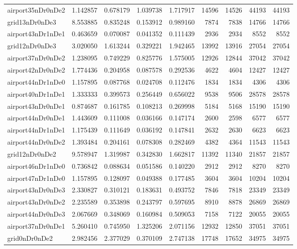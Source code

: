 \begin{longtable}{|l|r|r|r|r|r|r|r|r|}
airport35nDr0nDe2 & 1.142857 & 0.678179 & 1.039738 & 1.717917 & 14596 & 14526 & 44193 & 44193 \\
grid13nDr0nDe3 & 8.553885 & 0.835248 & 0.153912 & 0.989160 & 7874 & 7838 & 14766 & 14766 \\
airport43nDr1nDe1 & 0.463659 & 0.070087 & 0.041352 & 0.111439 & 2936 & 2934 & 8552 & 8552 \\
grid12nDr0nDe3 & 3.020050 & 1.613244 & 0.329221 & 1.942465 & 13992 & 13916 & 27054 & 27054 \\
airport37nDr0nDe2 & 1.238095 & 0.749229 & 0.825776 & 1.575005 & 12926 & 12844 & 37042 & 37042 \\
airport42nDr0nDe2 & 1.774436 & 0.204958 & 0.087578 & 0.292536 & 4622 & 4604 & 12427 & 12427 \\
airport44nDr1nDe0 & 1.157895 & 0.087768 & 0.024708 & 0.112476 & 1834 & 1834 & 4306 & 4306 \\
airport40nDr1nDe1 & 1.333333 & 0.399573 & 0.256449 & 0.656022 & 9538 & 9506 & 28578 & 28578 \\
airport43nDr0nDe1 & 0.874687 & 0.161785 & 0.108213 & 0.269998 & 5184 & 5168 & 15190 & 15190 \\
airport44nDr0nDe1 & 1.443609 & 0.111008 & 0.036166 & 0.147174 & 2600 & 2598 & 6577 & 6577 \\
airport44nDr1nDe1 & 1.175439 & 0.111649 & 0.036192 & 0.147841 & 2632 & 2630 & 6623 & 6623 \\
airport44nDr0nDe2 & 1.393484 & 0.204161 & 0.078308 & 0.282469 & 4382 & 4364 & 11543 & 11543 \\
grid12nDr0nDe2 & 9.578947 & 1.319987 & 0.342830 & 1.662817 & 11392 & 11340 & 21857 & 21857 \\
airport46nDr1nDe0 & 0.736842 & 0.088634 & 0.051586 & 0.140220 & 2912 & 2912 & 8270 & 8270 \\
airport47nDr1nDe0 & 1.157895 & 0.128097 & 0.049388 & 0.177485 & 3604 & 3604 & 10204 & 10204 \\
airport43nDr0nDe3 & 2.330827 & 0.310121 & 0.183631 & 0.493752 & 7846 & 7818 & 23349 & 23349 \\
airport43nDr0nDe2 & 2.235589 & 0.353898 & 0.243797 & 0.597695 & 8910 & 8878 & 26869 & 26869 \\
airport44nDr0nDe3 & 2.067669 & 0.348069 & 0.160984 & 0.509053 & 7158 & 7122 & 20055 & 20055 \\
airport37nDr0nDe1 & 5.260410 & 0.745950 & 1.325206 & 2.071156 & 12932 & 12850 & 37051 & 37051 \\
grid0nDr0nDe2 & 2.982456 & 2.377029 & 0.370109 & 2.747138 & 17748 & 17652 & 34975 & 34975 \\

\end{longtable}
